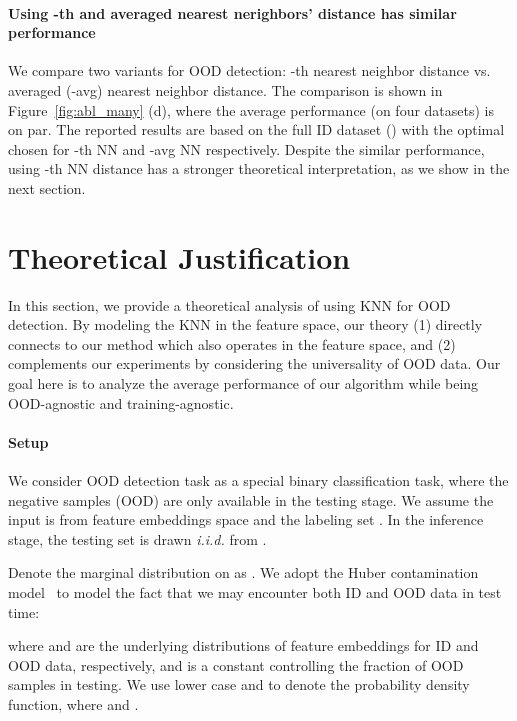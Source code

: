 \documentclass[nohyperref]{article}
\theoremstyle{plain}
\theoremstyle{definition}
\theoremstyle{remark}
\begin{document}
\vspace{-0.1cm}
\paragraph{Using -th and averaged  nearest nerighbors' distance has similar performance}
We compare two variants for OOD detection: -th nearest neighbor distance vs. averaged  (-avg) nearest neighbor distance. The comparison is shown in Figure~\ref{fig:abl_many} (d), where the average performance (on four datasets) is on par. The reported results are based on the full ID dataset () with the optimal  chosen for -th NN and -avg NN respectively. Despite the similar performance, using -th NN distance has a stronger theoretical interpretation, as we show in the next section. 


\section{Theoretical Justification}
\label{sec:theory}

In this section, we provide a theoretical analysis of using KNN for OOD detection. By modeling the KNN in the feature space, our theory (1) directly connects to our method which also operates in the feature space, and (2) complements our experiments by considering the universality of OOD data. Our goal here is to analyze the average performance of our algorithm while being OOD-agnostic and training-agnostic.

\paragraph{Setup}
We consider OOD detection task as a special binary classification task, where the negative samples (OOD) are only available in the testing stage. We assume the input is from feature embeddings space  and the labeling set . In the inference stage, the testing set  is drawn \textit{i.i.d.} from . 

Denote the marginal distribution on  as . We adopt the Huber contamination model~\citep{huber1964} to model the fact that we may encounter both ID and OOD data in test time:

where  and  are the underlying distributions of feature embeddings for ID and OOD data, respectively, and  is a constant controlling the fraction of OOD samples in testing. We use lower case  and  to denote the probability density function, where  and . 
\end{document}

